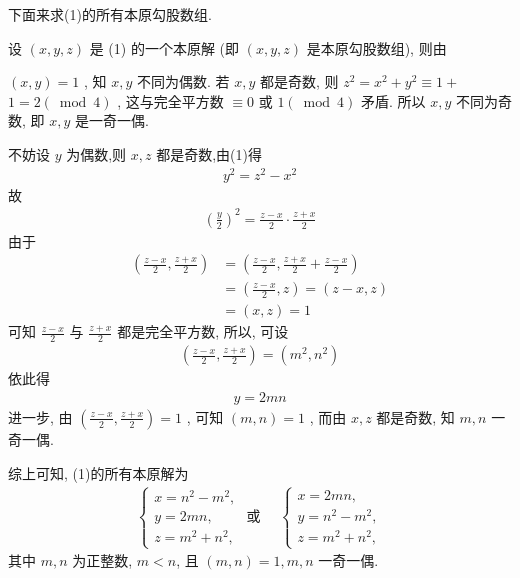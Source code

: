 下面来求(1)的所有本原勾股数组.

设 $(x, y, z)$ 是 (1) 的一个本原解 (即 $(x, y, z)$ 是本原勾股数组), 则由

$(x, y)=1$ , 知 $x ,  y$ 不同为偶数. 若 $x ,  y$ 都是奇数, 则 $z^{2}=x^{2}+y^{2} \equiv 1+$ $1=2(\bmod 4)$ , 这与完全平方数 $\equiv 0$ 或 $1(\bmod 4)$ 矛盾. 所以 $x ,  y$ 不同为奇数, 即 $x ,  y$ 是一奇一偶.

不妨设 $y$ 为偶数,则 $x ,  z$ 都是奇数,由(1)得
\begin{align*}
	y^{2}=z^{2}-x^{2}
\end{align*}
故
\begin{align*}
	\left(\frac{y}{2}\right)^{2}=\frac{z-x}{2} \cdot \frac{z+x}{2}
\end{align*}
由于
\begin{align}
	\left(\frac{z-x}{2}, \frac{z+x}{2}\right) & =\left(\frac{z-x}{2}, \frac{z+x}{2}+\frac{z-x}{2}\right) \\
	                                          & =\left(\frac{z-x}{2}, z\right)=(z-x, z)                  \\
	                                          & =(x, z)=1
\end{align}
可知 $\frac{z-x}{2}$ 与 $\frac{z+x}{2}$ 都是完全平方数, 所以, 可设
\begin{align*}
	\left(\frac{z-x}{2}, \frac{z+x}{2}\right)=\left(m^{2}, n^{2}\right)
\end{align*}
依此得
\begin{align*}
	y=2 m n
\end{align*}
进一步, 由 $\left(\frac{z-x}{2}, \frac{z+x}{2}\right)=1$ , 可知 $(m, n)=1$ , 而由 $x ,  z$ 都是奇数, 知 $m, n$ 一奇一偶.

综上可知, (1)的所有本原解为
\begin{align*}
	\left\{\begin{array} { l }
		       { x = n ^ { 2 } - m ^ { 2 } , } \\
		       { y = 2 m n , }                 \\
		       { z = m ^ { 2 } + n ^ { 2 } , }
	       \end{array} \text { 或 } \quad \left\{\begin{array}{l}
		                                             x=2 m n,       \\
		                                             y=n^{2}-m^{2}, \\
		                                             z=m^{2}+n^{2},
	                                             \end{array}\right.\right.
\end{align*}
其中 $m ,  n$ 为正整数, $m<n$, 且 $(m, n)=1, m ,  n$ 一奇一偶.

